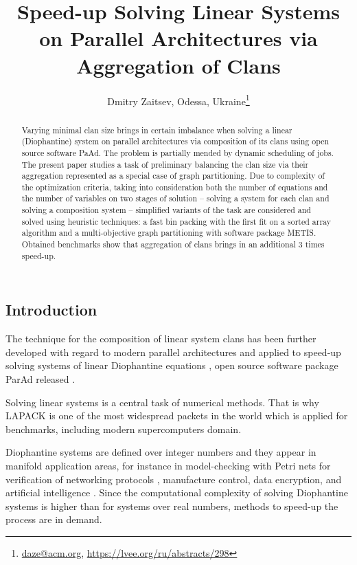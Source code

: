 \documentclass[10pt, a5paper]{article}
\begin{document}
\title{Speed-up Solving Linear Systems on Parallel Architectures via Aggregation of Clans}
\author{Dmitry Zaitsev, Odessa, Ukraine\footnote{\url{daze@acm.org}, \url {https://lvee.org/ru/abstracts/298}}}
\maketitle
\begin{abstract}
Varying minimal clan size brings in certain imbalance when solving a linear (Diophantine) system on parallel architectures via composition of its clans using open source software PaAd. The problem is partially mended by dynamic scheduling of jobs. The present paper studies a task of preliminary balancing the clan size via their aggregation represented as a special case of graph partitioning. Due to complexity of the optimization criteria, taking into consideration both the number of equations and the number of variables on two stages of solution -- solving a system for each clan and solving a composition system -- simplified variants of the task are considered and solved using heuristic techniques: a fast bin packing with the first fit on a sorted array algorithm and a multi-objective graph partitioning with software package METIS. Obtained benchmarks show that aggregation of clans brings in an additional 3 times speed-up.
\end{abstract}
\subsection*{Introduction}

The technique for the composition of linear system clans \cite{bib1} has been further developed with regard to modern parallel architectures and applied to speed-up solving systems of linear Diophantine equations \cite{bib2}, open source software package ParAd released \cite{bib3}.

Solving linear systems is a central task of numerical methods. That is why LAPACK \cite{bib4} is one of the most widespread packets in the world which is applied for benchmarks, including modern supercomputers domain.

Diophantine systems are defined over integer numbers and they appear in manifold application areas, for instance in model-checking with Petri nets for verification of networking protocols \cite{bib5}, manufacture control, data encryption, and artificial intelligence \cite{bib6}. Since the \linebreak computational complexity of solving Diophantine systems is higher than for systems over real numbers, methods to speed-up the process are in demand.
\end{document}
